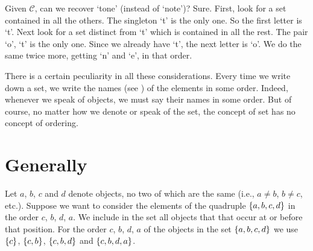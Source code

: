 Given $\mathcal{C} $, can we recover `tone' (instead of `note')?
Sure.
First, look for a set contained in all the others.
The singleton {`t'} is the only one.
So the first letter is `t'.
Next look for a set distinct from `t' which is contained in all the rest.
The pair {`o', `t'} is the only one.
Since we already have `t', the next letter is `o'.
We do the same twice more, getting `n' and `e', in that order.

There is a certain peculiarity in all these considerations.
Every time we write down a set, we write the names (see ) of the elements in some order.
Indeed, whenever we speak of objects, we must say their names in some order.
But of course, no matter how we denote or speak of the set, the concept of set has no concept of ordering.

\section*{Generally}

Let $a$, $b$, $c$ and $d$ denote objects, no two of which are the same (i.e., $a \neq b$, $b \neq c$, etc.).
Suppose we want to consider the elements of the quadruple $\{a, b, c, d\}$ in the order $c$, $b$, $d$, $a$.
We include in the set all objects that that occur at or before that position.
For the order $c$, $b$, $d$, $a$ of the objects in the set $\{a, b, c, d\}$ we use $\{c\}$, $\{c, b\}$, $\{c, b, d\}$ and $\{c, b, d, a\}$.

